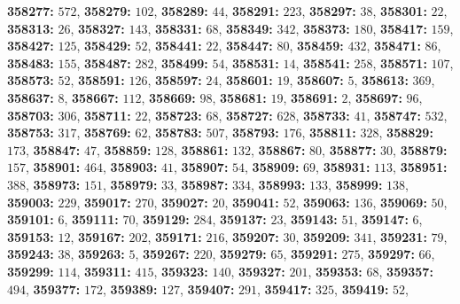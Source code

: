 \textsf{\bfseries 358277:} $572$, \textsf{\bfseries 358279:} $102$, \textsf{\bfseries 358289:} $44$, \textsf{\bfseries 358291:} $223$, \textsf{\bfseries 358297:} $38$, \textsf{\bfseries 358301:} $22$, \textsf{\bfseries 358313:} $26$, \textsf{\bfseries 358327:} $143$, \textsf{\bfseries 358331:} $68$, \textsf{\bfseries 358349:} $342$, \textsf{\bfseries 358373:} $180$, \textsf{\bfseries 358417:} $159$, \textsf{\bfseries 358427:} $125$, \textsf{\bfseries 358429:} $52$, \textsf{\bfseries 358441:} $22$, \textsf{\bfseries 358447:} $80$, \textsf{\bfseries 358459:} $432$, \textsf{\bfseries 358471:} $86$, \textsf{\bfseries 358483:} $155$, \textsf{\bfseries 358487:} $282$, \textsf{\bfseries 358499:} $54$, \textsf{\bfseries 358531:} $14$, \textsf{\bfseries 358541:} $258$, \textsf{\bfseries 358571:} $107$, \textsf{\bfseries 358573:} $52$, \textsf{\bfseries 358591:} $126$, \textsf{\bfseries 358597:} $24$, \textsf{\bfseries 358601:} $19$, \textsf{\bfseries 358607:} $5$, \textsf{\bfseries 358613:} $369$, \textsf{\bfseries 358637:} $8$, \textsf{\bfseries 358667:} $112$, \textsf{\bfseries 358669:} $98$, \textsf{\bfseries 358681:} $19$, \textsf{\bfseries 358691:} $2$, \textsf{\bfseries 358697:} $96$, \textsf{\bfseries 358703:} $306$, \textsf{\bfseries 358711:} $22$, \textsf{\bfseries 358723:} $68$, \textsf{\bfseries 358727:} $628$, \textsf{\bfseries 358733:} $41$, \textsf{\bfseries 358747:} $532$, \textsf{\bfseries 358753:} $317$, \textsf{\bfseries 358769:} $62$, \textsf{\bfseries 358783:} $507$, \textsf{\bfseries 358793:} $176$, \textsf{\bfseries 358811:} $328$, \textsf{\bfseries 358829:} $173$, \textsf{\bfseries 358847:} $47$, \textsf{\bfseries 358859:} $128$, \textsf{\bfseries 358861:} $132$, \textsf{\bfseries 358867:} $80$, \textsf{\bfseries 358877:} $30$, \textsf{\bfseries 358879:} $157$, \textsf{\bfseries 358901:} $464$, \textsf{\bfseries 358903:} $41$, \textsf{\bfseries 358907:} $54$, \textsf{\bfseries 358909:} $69$, \textsf{\bfseries 358931:} $113$, \textsf{\bfseries 358951:} $388$, \textsf{\bfseries 358973:} $151$, \textsf{\bfseries 358979:} $33$, \textsf{\bfseries 358987:} $334$, \textsf{\bfseries 358993:} $133$, \textsf{\bfseries 358999:} $138$, \textsf{\bfseries 359003:} $229$, \textsf{\bfseries 359017:} $270$, \textsf{\bfseries 359027:} $20$, \textsf{\bfseries 359041:} $52$, \textsf{\bfseries 359063:} $136$, \textsf{\bfseries 359069:} $50$, \textsf{\bfseries 359101:} $6$, \textsf{\bfseries 359111:} $70$, \textsf{\bfseries 359129:} $284$, \textsf{\bfseries 359137:} $23$, \textsf{\bfseries 359143:} $51$, \textsf{\bfseries 359147:} $6$, \textsf{\bfseries 359153:} $12$, \textsf{\bfseries 359167:} $202$, \textsf{\bfseries 359171:} $216$, \textsf{\bfseries 359207:} $30$, \textsf{\bfseries 359209:} $341$, \textsf{\bfseries 359231:} $79$, \textsf{\bfseries 359243:} $38$, \textsf{\bfseries 359263:} $5$, \textsf{\bfseries 359267:} $220$, \textsf{\bfseries 359279:} $65$, \textsf{\bfseries 359291:} $275$, \textsf{\bfseries 359297:} $66$, \textsf{\bfseries 359299:} $114$, \textsf{\bfseries 359311:} $415$, \textsf{\bfseries 359323:} $140$, \textsf{\bfseries 359327:} $201$, \textsf{\bfseries 359353:} $68$, \textsf{\bfseries 359357:} $494$, \textsf{\bfseries 359377:} $172$, \textsf{\bfseries 359389:} $127$, \textsf{\bfseries 359407:} $291$, \textsf{\bfseries 359417:} $325$, \textsf{\bfseries 359419:} $52$, 
